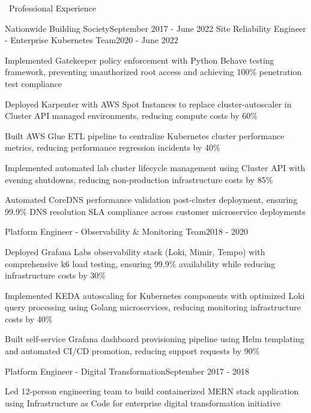 \documentclass{resume} %
\begin{document}
\begin{rSection}{{\color{sectioncolor}\faBriefcase}\ Professional Experience}
\begin{rSubsection}{Nationwide Building Society}{September 2017 - June 2022}
{Site Reliability Engineer - Enterprise Kubernetes Team}{2020 - June 2022}
\normalfont
\item Implemented Gatekeeper policy enforcement with Python Behave testing framework, preventing unauthorized root access and achieving 100\% penetration test compliance
\item Deployed Karpenter with AWS Spot Instances to replace cluster-autoscaler in Cluster API managed environments, reducing compute costs by 60\%
\item Built AWS Glue ETL pipeline to centralize Kubernetes cluster performance metrics, reducing performance regression incidents by 40\%
\item Implemented automated lab cluster lifecycle management using Cluster API with evening shutdowns, reducing non-production infrastructure costs by 85\%
\item Automated CoreDNS performance validation post-cluster deployment, ensuring 99.9\% DNS resolution SLA compliance across customer microservice deployments
\end{rSubsection}

\begin{rSubsection}{}{}{Platform Engineer - Observability \& Monitoring Team}{2018 - 2020}
\normalfont
\item Deployed Grafana Labs observability stack (Loki, Mimir, Tempo) with comprehensive k6 load testing, ensuring 99.9\% availability while reducing infrastructure costs by 30\%
\item Implemented KEDA autoscaling for Kubernetes components with optimized Loki query processing using Golang microservices, reducing monitoring infrastructure costs by 40\%
\item Built self-service Grafana dashboard provisioning pipeline using Helm templating and automated CI/CD promotion, reducing support requests by 90\%
\end{rSubsection}

\begin{rSubsection}{}{}{Platform Engineer - Digital Transformation}{September 2017 - 2018}
\normalfont
\item Led 12-person engineering team to build containerized MERN stack application using Infrastructure as Code for enterprise digital transformation initiative
\end{rSubsection}

\end{rSection}
\end{document}
